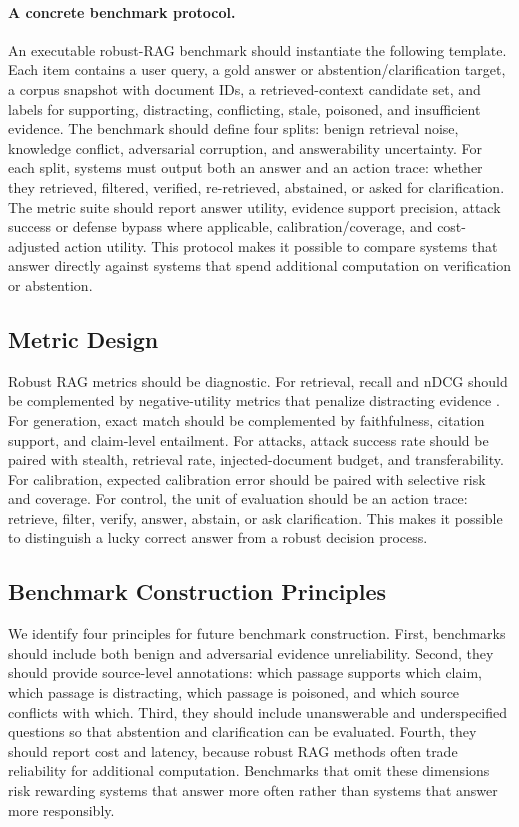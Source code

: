 \documentclass[11pt]{article}
\begin{document}
\paragraph{A concrete benchmark protocol.}
An executable robust-RAG benchmark should instantiate the following template. Each item contains a user query, a gold answer or abstention/clarification target, a corpus snapshot with document IDs, a retrieved-context candidate set, and labels for supporting, distracting, conflicting, stale, poisoned, and insufficient evidence. The benchmark should define four splits: benign retrieval noise, knowledge conflict, adversarial corruption, and answerability uncertainty. For each split, systems must output both an answer and an action trace: whether they retrieved, filtered, verified, re-retrieved, abstained, or asked for clarification. The metric suite should report answer utility, evidence support precision, attack success or defense bypass where applicable, calibration/coverage, and cost-adjusted action utility. This protocol makes it possible to compare systems that answer directly against systems that spend additional computation on verification or abstention.

\subsection{Metric Design}

Robust RAG metrics should be diagnostic. For retrieval, recall and nDCG should be complemented by negative-utility metrics that penalize distracting evidence \citep{rrag058}. For generation, exact match should be complemented by faithfulness, citation support, and claim-level entailment. For attacks, attack success rate should be paired with stealth, retrieval rate, injected-document budget, and transferability. For calibration, expected calibration error should be paired with selective risk and coverage. For control, the unit of evaluation should be an action trace: retrieve, filter, verify, answer, abstain, or ask clarification. This makes it possible to distinguish a lucky correct answer from a robust decision process.

\subsection{Benchmark Construction Principles}

We identify four principles for future benchmark construction. First, benchmarks should include both benign and adversarial evidence unreliability. Second, they should provide source-level annotations: which passage supports which claim, which passage is distracting, which passage is poisoned, and which source conflicts with which. Third, they should include unanswerable and underspecified questions so that abstention and clarification can be evaluated. Fourth, they should report cost and latency, because robust RAG methods often trade reliability for additional computation. Benchmarks that omit these dimensions risk rewarding systems that answer more often rather than systems that answer more responsibly.
\end{document}
